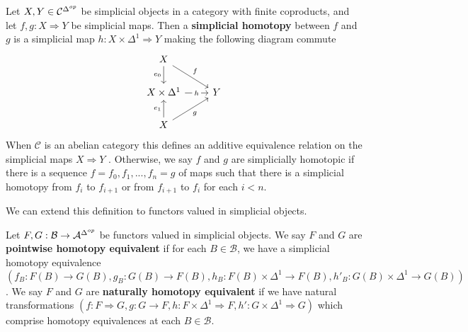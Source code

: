 \begin{defn}{}
    Let $X, Y \in \mathcal{C}^{\Delta^{op}}$ be simplicial objects in a category with finite coproducts, and let $f,g:X\Rightarrow Y$ be simplicial maps. Then a \textbf{simplicial homotopy} between $f$ and $g$ is a simplicial map $h:X\times \Delta^1\Rightarrow Y$ making the following diagram commute
    \[\begin{tikzcd}
    	X \\
    	{X\times \Delta^1} & Y \\
    	X
    	\arrow["h"{description}, from=2-1, to=2-2]
    	\arrow["{e_0}"', from=1-1, to=2-1]
    	\arrow["f", from=1-1, to=2-2]
    	\arrow["{e_1}", from=3-1, to=2-1]
    	\arrow["g"', from=3-1, to=2-2]
    \end{tikzcd}\]
    When $\mathcal{C}$ is an abelian category this defines an additive equivalence relation on the simplicial maps $X\Rightarrow Y$ \cite{weibel_1994}. Otherwise, we say $f$ and $g$ are simplicially homotopic if there is a sequence $f = f_0,f_1,...,f_n = g$ of maps such that there is a simplicial homotopy from $f_i$ to $f_{i+1}$ or from $f_{i+1}$ to $f_i$ for each $i < n$.
\end{defn}

We can extend this definition to functors valued in simplicial objects.

\begin{defn}{}
    Let $F,G:\mathcal{B}\rightarrow \mathcal{A}^{\Delta^{op}}$ be functors valued in simplicial objects. We say $F$ and $G$ are \textbf{pointwise homotopy equivalent} if for each $B \in \mathcal{B}$, we have a simplicial homotopy equivalence $(f_B:F(B)\rightarrow G(B), g_B:G(B)\rightarrow F(B), h_B:F(B)\times \Delta^1\rightarrow F(B), h'_B:G(B)\times \Delta^1\rightarrow G(B))$. We say $F$ and $G$ are \textbf{naturally homotopy equivalent} if we have natural transformations $(f:F\Rightarrow G,g:G\rightarrow F,h:F\times \Delta^1\Rightarrow F,h':G\times \Delta^1\Rightarrow G)$ which comprise homotopy equivalences at each $B \in \mathcal{B}$.
\end{defn}

